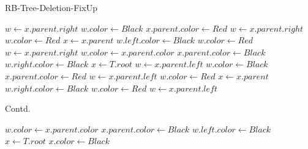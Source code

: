 \documentclass{article}
\begin{document}
\begin{algorithm}[H]
    \caption{RB-Tree-Deletion-FixUp}
    \begin{algorithmic}[1]
        \State $w \gets x.parent.right$
        \State $w.color \gets Black$
        \State $x.parent.color \gets Red$
        \State {}
        \State $w \gets x.parent.right$
        \EndIf
        \State $w.color \gets Red$
        \State $x \gets x.parent$
        \Else
        \State $w.left.color \gets Black$
        \State $w.color \gets Red$
        \State {}
        \State $w \gets x.parent.right$
        \EndIf
        \State $w.color \gets x.parent.color$
        \State $x.parent.color \gets Black$
        \State $w.right.color \gets Black$
        \State {}
        \State $x \gets T.root$
        \EndIf
        \Else
        \State $w \gets x.parent.left$
        \State $w.color \gets Black$
        \State $x.parent.color \gets Red$
        \State {}
        \State $w \gets x.parent.left$
        \EndIf
        \State $w.color \gets Red$
        \State $x \gets x.parent$
        \Else
        \State $w.right.color \gets Black$
        \State $w.color \gets Red$
        \State {}
        \State $w \gets x.parent.left$
    \end{algorithmic}
\end{algorithm}

\begin{algorithm}
\caption{Contd.}
\begin{algorithmic}[1]
\EndIf
\State $w.color \gets x.parent.color$
\State $x.parent.color \gets Black$
\State $w.left.color \gets Black$
\State {}
\State $x \gets T.root$
\EndIf
\EndIf
\EndWhile
\State $x.color \gets Black$
\EndProcedure
\end{algorithmic}
\end{algorithm}
\end{document}
